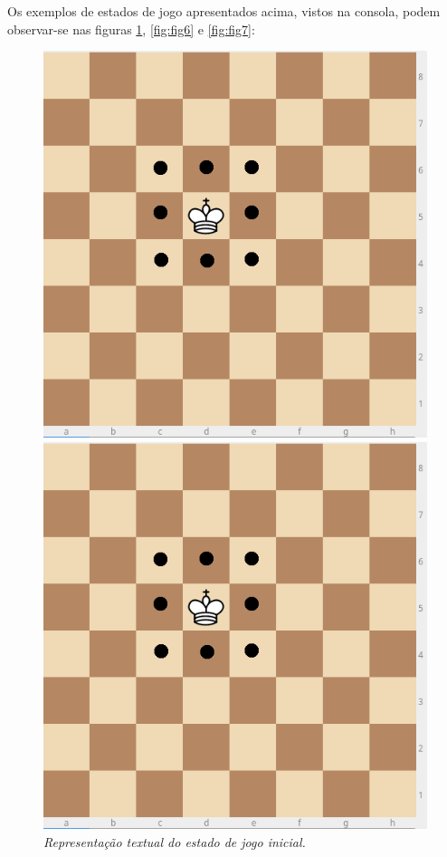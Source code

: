 \documentclass[a4paper]{article}
\begin{document}
Os exemplos de estados de jogo apresentados acima, vistos na consola, podem observar-se nas figuras \ref{fig:fig5}, \ref{fig:fig6} e \ref{fig:fig7}:

\begin{tiny}
\begin{figure}[H]
\includegraphics[scale=0.2]{board1.png}
\caption{\textit{Representação textual do estado de jogo inicial.}}
\label{fig:fig5}
\endminipage\hfill
{}
\includegraphics[scale=0.2]{board1.png}

\end{figure}
\end{tiny}
\end{document}
